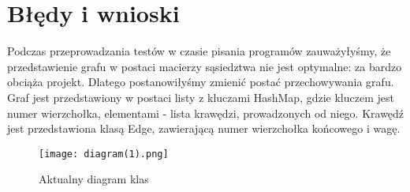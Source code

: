 \documentclass[]{article}
\begin{document}
\section{Błędy i wnioski}\label{header-n233}

Podczas przeprowadzania testów w czasie pisania programów zauważyłyśmy, że przedstawienie grafu w postaci macierzy sąsiedztwa nie jest optymalne: za bardzo obciąża projekt. Dlatego postanowiłyśmy zmienić postać przechowywania grafu. Graf jest przedstawiony w postaci listy z kluczami HashMap, gdzie kluczem jest numer wierzchołka, elementami - lista krawędzi, prowadzonych od niego. Krawędź jest przedstawiona klasą Edge, zawierającą numer wierzchołka końcowego i wagę. 


\begin{figure}[H]
  \texttt{[image: diagram(1).png]}
  \caption{Aktualny diagram klas}
  \label{fig:graf}
\end{figure}
\end{document}
